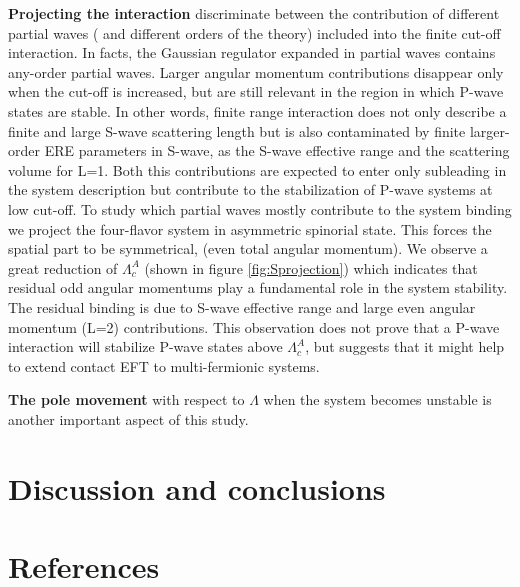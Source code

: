 \documentclass[preprint,12pt]{elsarticle}
\begin{document}
\textbf{Projecting the interaction} discriminate between the contribution of different partial waves ( and different orders of the theory) included into the finite cut-off interaction.
In facts, the Gaussian regulator expanded in partial waves contains any-order partial waves.
Larger angular momentum contributions disappear only when the cut-off is increased, but are still relevant in the region in which P-wave states are stable. 
In other words, finite range interaction does not only describe a finite and large S-wave scattering length but is also contaminated by finite larger-order ERE parameters in S-wave, as the S-wave effective range and the scattering volume for L=1.
Both this contributions are expected to enter only subleading in the system description but contribute to the stabilization of P-wave systems at low cut-off.
To study which partial waves mostly contribute to the system binding we project the four-flavor system in asymmetric spinorial state.
This forces the spatial part to be symmetrical, (even total angular momentum). 
We observe a great reduction of $\Lambda_c^A$ (shown in figure \ref{fig:Sprojection}) which indicates that residual odd angular momentums play a fundamental role in the system stability.
The residual binding is due to S-wave effective range and large even angular momentum (L=2) contributions.
This observation does not prove that a P-wave interaction will stabilize P-wave states above $\Lambda_c^A$, but suggests that it might help to extend contact EFT to multi-fermionic systems.

\textbf{The pole movement} with respect to $\Lambda$ when the system becomes unstable is another important aspect of this study.



\section{Discussion and conclusions}

\newpage
\section*{References}


\end{document}
